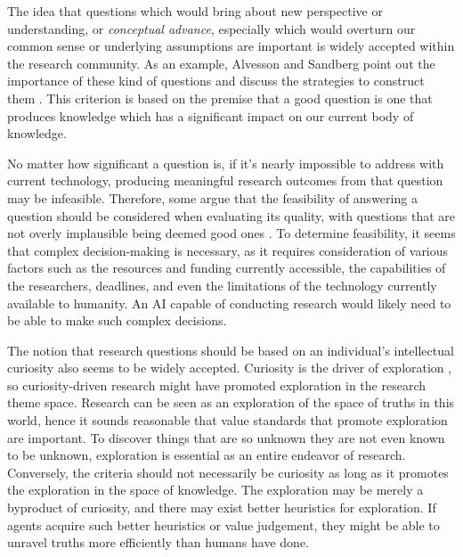 The idea that questions which would bring about new perspective or understanding, or \textit{conceptual advance}, especially which would overturn our common sense or underlying assumptions are important is widely accepted within the research community. As an example, Alvesson and Sandberg point out the importance of these kind of questions and discuss the strategies to construct them \cite{alvesson2013constructing}. 
This criterion is based on the premise that a good question is one that produces knowledge which has a significant impact on our current body of knowledge.

No matter how significant a question is, if it's nearly impossible to address with current technology, producing meaningful research outcomes from that question may be infeasible. Therefore, some argue that the feasibility of answering a question should be considered when evaluating its quality, with questions that are not overly implausible being deemed good ones \cite{hulley2007designing,alon2009choose,huntington2021effect}. To determine feasibility, it seems that complex decision-making is necessary, as it requires consideration of various factors such as the resources and funding currently accessible, the capabilities of the researchers, deadlines, and even the limitations of the technology currently available to humanity. An AI capable of conducting research would likely need to be able to make such complex decisions.

The notion that research questions should be based on an individual's intellectual curiosity also seems to be widely accepted. Curiosity is the driver of exploration \cite{oudeyer2018computational}, so curiosity-driven research might have promoted exploration in the research theme space. Research can be seen as an exploration of the space of truths in this world, hence it sounds reasonable that value standards that promote exploration are important.
To discover things that are so unknown they are not even known to be unknown, exploration is essential as an entire endeavor of research.
Conversely, the criteria should not necessarily be curiosity as long as it promotes the exploration in the space of knowledge. The exploration may be merely a byproduct of curiosity, and there may exist better heuristics for exploration. If agents acquire such better heuristics or value judgement, they might be able to unravel truths more efficiently than humans have done.


